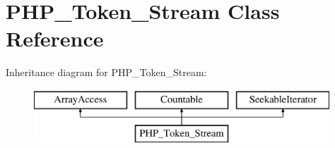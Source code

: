 \hypertarget{class_p_h_p___token___stream}{}\section{P\+H\+P\+\_\+\+Token\+\_\+\+Stream Class Reference}
\label{class_p_h_p___token___stream}
Inheritance diagram for P\+H\+P\+\_\+\+Token\+\_\+\+Stream\+:\begin{figure}[H]
\begin{center}
\leavevmode
\includegraphics[height=2.000000cm]{class_p_h_p___token___stream}
\end{center}
\end{figure}
